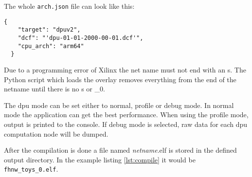 The whole \texttt{arch.json} file can look like this:
\begin{lstlisting}[style=bash, caption={}, label=lst:arch_json]
  {
  	"target": "dpuv2",
  	"dcf": "'dpu-01-01-2000-00-01.dcf'",
  	"cpu_arch": "arm64"
  }
\end{lstlisting}

Due to a programming error of Xilinx the net name must not end with an s.
The Python script which loads the overlay removes everything from the end of the netname until there is no s or \_0.

The \acrshort{dpu} mode can be set either to normal, profile or debug mode.
In normal mode the application can get the best performance.
When using the profile mode, output is printed to the console.
If debug mode is selected, raw data for each \acrshort{dpu} computation node will be dumped.

After the compilation is done a file named \textit{netname}.elf is stored in the defined output directory.
In the example listing \ref{lst:compile} it would be \texttt{fhnw\_toys\_0.elf}.